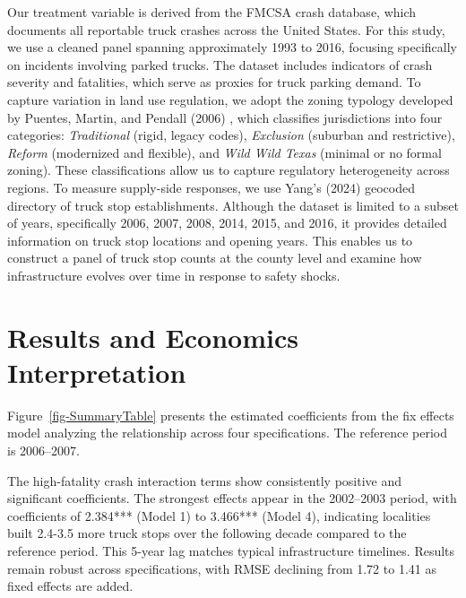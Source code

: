 \documentclass[
  12pt]{article}
\begin{document}
Our treatment variable is derived from the FMCSA crash database, which
documents all reportable truck crashes across the United States. For
this study, we use a cleaned panel spanning approximately 1993 to 2016,
focusing specifically on incidents involving parked trucks. The dataset
includes indicators of crash severity and fatalities, which serve as
proxies for truck parking demand. To capture variation in land use
regulation, we adopt the zoning typology developed by Puentes, Martin,
and Pendall (2006) \citep{puentesTraditionalReformedReview2006}, which
classifies jurisdictions into four categories: \emph{Traditional}
(rigid, legacy codes), \emph{Exclusion} (suburban and restrictive),
\emph{Reform} (modernized and flexible), and \emph{Wild Wild Texas}
(minimal or no formal zoning). These classifications allow us to capture
regulatory heterogeneity across regions. To measure supply-side
responses, we use Yang's (2024) geocoded directory of truck stop
establishments. Although the dataset is limited to a subset of years,
specifically 2006, 2007, 2008, 2014, 2015, and 2016, it provides
detailed information on truck stop locations and opening years. This
enables us to construct a panel of truck stop counts at the county level
and examine how infrastructure evolves over time in response to safety
shocks.

\section{Results and Economics
Interpretation}\label{results-and-economics-interpretation}

Figure~\ref{fig-SummaryTable} presents the estimated coefficients from
the fix effects model analyzing the relationship across four
specifications. The reference period is 2006--2007.

The high-fatality crash interaction terms show consistently positive and
significant coefficients. The strongest effects appear in the 2002--2003
period, with coefficients of 2.384*** (Model 1) to 3.466*** (Model 4),
indicating localities built 2.4-3.5 more truck stops over the following
decade compared to the reference period. This 5-year lag matches typical
infrastructure timelines. Results remain robust across specifications,
with RMSE declining from 1.72 to 1.41 as fixed effects are added.
\end{document}
